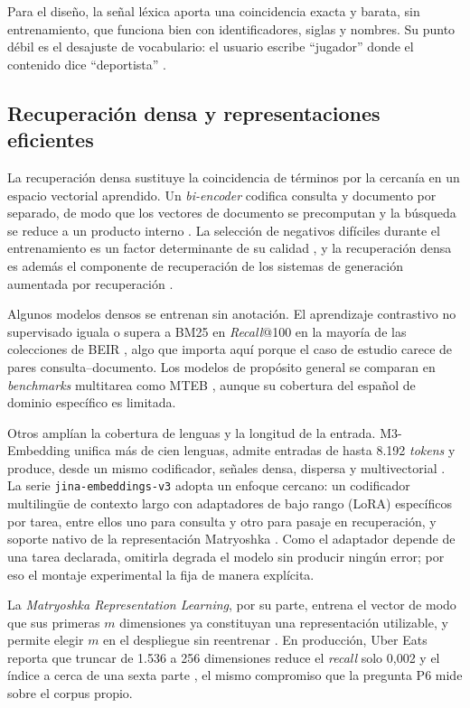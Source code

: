 \documentclass[11pt,letterpaper]{article}
\numberwithin{equation}{section}
\begin{document}
Para el diseño, la señal léxica aporta una coincidencia exacta y barata, sin entrenamiento, que funciona bien con identificadores, siglas y nombres. Su punto débil es el desajuste de vocabulario: el usuario escribe ``jugador'' donde el contenido dice ``deportista'' \cite{karpukhin2020dpr}.

\subsection{Recuperación densa y representaciones eficientes}
\label{sec:ea-densa}
La recuperación densa sustituye la coincidencia de términos por la cercanía en un espacio vectorial aprendido. Un \textit{bi-encoder} codifica consulta y documento por separado, de modo que los vectores de documento se precomputan y la búsqueda se reduce a un producto interno \cite{karpukhin2020dpr,reimers2019sbert}. La selección de negativos difíciles durante el entrenamiento es un factor determinante de su calidad \cite{xiong2021ance}, y la recuperación densa es además el componente de recuperación de los sistemas de generación aumentada por recuperación \cite{lewis2020rag}.

Algunos modelos densos se entrenan sin anotación. El aprendizaje contrastivo no supervisado iguala o supera a BM25 en \textit{Recall}@100 en la mayoría de las colecciones de BEIR \cite{izacard2022contriever}, algo que importa aquí porque el caso de estudio carece de pares consulta--documento. Los modelos de propósito general se comparan en \textit{benchmarks} multitarea como MTEB \cite{muennighoff2023mteb}, aunque su cobertura del español de dominio específico es limitada.

Otros amplían la cobertura de lenguas y la longitud de la entrada. M3-Embedding unifica más de cien lenguas, admite entradas de hasta 8.192 \textit{tokens} y produce, desde un mismo codificador, señales densa, dispersa y multivectorial \cite{chen2024m3}. La serie \texttt{jina-embeddings-v3} adopta un enfoque cercano: un codificador multilingüe de contexto largo con adaptadores de bajo rango (LoRA) específicos por tarea, entre ellos uno para consulta y otro para pasaje en recuperación, y soporte nativo de la representación Matryoshka \cite{sturua2024jinav3}. Como el adaptador depende de una tarea declarada, omitirla degrada el modelo sin producir ningún error; por eso el montaje experimental la fija de manera explícita.

La \textit{Matryoshka Representation Learning}, por su parte, entrena el vector de modo que sus primeras $m$ dimensiones ya constituyan una representación utilizable, y permite elegir $m$ en el despliegue sin reentrenar \cite{kusupati2022matryoshka}. En producción, Uber Eats reporta que truncar de 1.536 a 256 dimensiones reduce el \textit{recall} solo 0{,}002 y el índice a cerca de una sexta parte \cite{ling2026ubereats}, el mismo compromiso que la pregunta P6 mide sobre el corpus propio.
\end{document}
